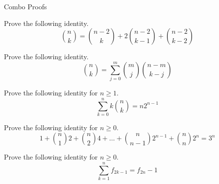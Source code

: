 \documentclass[11pt,letterpaper,boxed]{hmcpset}
\begin{document}
\begin{center}
    \LARGE{Combo Proofs}
\end{center}


\begin{problem}
    Prove the following identity.
    $$\binom{n}{k}=\binom{n-2}{k}+2\binom{n-2}{k-1}+\binom{n-2}{k-2}$$
\end{problem}

\begin{solution}
    \vfill
\end{solution}

\newpage


\begin{problem}
    Prove the following identity.
    $$\binom{n}{k}=\sum_{j=0}^m\binom{m}{j}\binom{n-m}{k-j}$$
\end{problem}

\begin{solution}
    \vfill
\end{solution}

\newpage


\begin{problem}
    Prove the following identity for $n\geq1$.
    $$\sum_{k=0}^nk\binom{n}{k}=n2^{n-1}$$
\end{problem}

\begin{solution}
    \vfill
\end{solution}

\newpage


\begin{problem}
    Prove the following identity for $n\geq0$.
    $$1+\binom{n}{1}2+\binom{n}{2}4+\ldots+\binom{n}{n-1}2^{n-1}+\binom{n}{n}2^n=3^n$$
\end{problem}

\begin{solution}
    \vfill
\end{solution}

\newpage


\begin{problem}
    Prove the following identity for $n\geq0$.
    $$\sum_{k=1}^nf_{2k-1}=f_{2n}-1$$
\end{problem}
\end{document}

